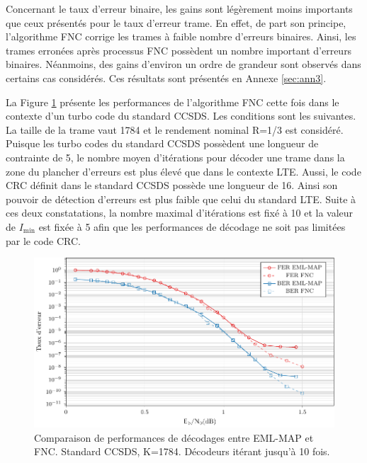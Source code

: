 Concernant le taux d'erreur binaire, les gains sont légèrement moins importants que ceux présentés pour le taux d'erreur trame. En effet,
de part son principe, l'algorithme FNC corrige les trames à faible nombre d'erreurs binaires. Ainsi, les trames erronées 
après processus FNC possèdent un nombre important d'erreurs binaires. Néanmoins, des gains d'environ un ordre de grandeur 
sont observés dans certains cas considérés. Ces résultats sont présentés en Annexe \ref{sec:ann3}.

La Figure \ref{fig:fnc_ccsds} présente les performances de l'algorithme FNC cette fois dans le contexte d'un turbo code 
du standard CCSDS. Les conditions sont les suivantes. La taille de la trame vaut 1784 et le rendement nominal R=1/3 est 
considéré. 
Puisque les turbo codes du standard CCSDS possèdent une longueur de contrainte de 5, le nombre moyen d'itérations pour 
décoder une trame dans la zone du plancher d'erreurs est plus élevé que dans le contexte LTE. Aussi, le code CRC définit 
dans le standard CCSDS possède une longueur de 16. Ainsi son pouvoir de détection d'erreurs est plus faible que celui du 
standard LTE. Suite à ces deux constatations, la nombre maximal d'itérations est fixé à 10 et la valeur de $I_\text{min}$
est fixée à 5 afin que les performances de décodage ne soit pas limitées par le code CRC.

\begin{figure}[!hb]
	\centering
	\includegraphics[width=\textwidth]{main/ch3_fig/fnc/ccsds/tikz/ccsds.pdf}
	\caption{Comparaison de performances de décodages entre EML-MAP et FNC. Standard CCSDS, K=1784.
	Décodeurs itérant jusqu'à 10 fois. \label{fig:fnc_ccsds}}
\end{figure}

